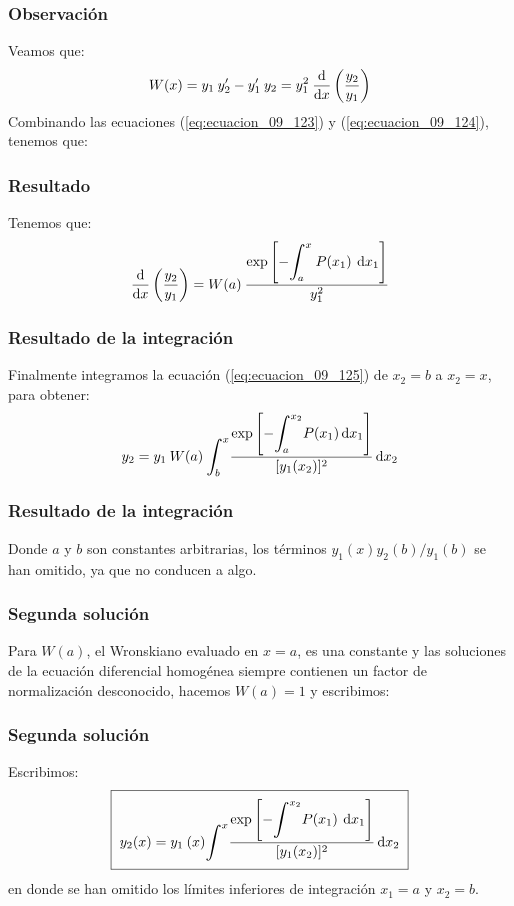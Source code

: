 \documentclass[12pt]{beamer}
\begin{document}
\begin{frame}
\frametitle{Observación}
Veamos que:
\begin{align}
W (x) = y_{1} \: {y}^{\prime}_{2} - {y}^{\prime}_{1} \: y_{2} = y_{1}^{2} \: \dv{x} \left( \dfrac{y_{2}}{y_{1}} \right)
\label{eq:ecuacion_09_124}
\end{align}
Combinando las ecuaciones (\ref{eq:ecuacion_09_123}) y (\ref{eq:ecuacion_09_124}), tenemos que:
\end{frame}
\begin{frame}
\frametitle{Resultado}
Tenemos que:
\pause
\begin{align}
\dv{x} \left( \dfrac{y_{2}}{y_{1}} \right) =  W (a) \: \dfrac{\exp \left[\displaystyle - \scaleint{6ex}_{\bs a}^{x} \: P (x_{1}) \: \dd{x_{1}} \right]}{y_{1}^{2}}
\label{eq:ecuacion_09_125}
\end{align}
\end{frame}
\begin{frame}
\frametitle{Resultado de la integración}
Finalmente integramos la ecuación (\ref{eq:ecuacion_09_125}) de $x_{2} = b$ a $x_{2} = x$, para obtener:
\pause
\begin{align}
y_{2} = y_{1} \: W (a) \: \scaleint{6ex}_{\bs b}^{x} \dfrac{\exp \left[ \displaystyle - \scaleint{6ex}_{\bs a}^{x_{2}} P (x_{1}) \dd{x_{1}} \right]}{[y_{1} (x_{2})]^{2}} \dd{x_{2}}
\label{eq:ecuacion_09_126}
\end{align}
\end{frame}
\begin{frame}
\frametitle{Resultado de la integración}
Donde $a$ y $b$ son constantes arbitrarias, los términos $y_{1}(x)y_{2}(b)/y_{1}(b)$ se han omitido, ya que no conducen a algo.
\end{frame}
\begin{frame}
\frametitle{Segunda solución}
Para $W(a)$, el Wronskiano evaluado en $x = a$, es una constante y las soluciones de la ecuación diferencial homogénea siempre contienen un factor de normalización desconocido, hacemos $W (a) = 1$ y escribimos:
\end{frame}
\begin{frame}
\frametitle{Segunda solución}
Escribimos:
\pause
\begin{align}
\setlength{\fboxsep}{2\fboxsep}\boxed{y_{2}(x) =  y_{1} \: (x) \scaleint{6ex}^{x} \dfrac{\exp \left[ \displaystyle - \scaleint{6ex}^{x_{2}} P(x_{1}) \: \dd{x_{1}} \right]}{[y_{1}(x_{2})]^{2}} \dd{x_{2}}}
\label{eq:ecuacion_09_127}
\end{align}
en donde se han omitido los límites inferiores de integración $x_{1} = a$ y $x_{2}=b$.
\end{frame}
\end{document}
